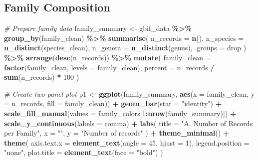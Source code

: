 \documentclass[
]{article}
\newenvironment{Shaded}{\begin{snugshade}}{\end{snugshade}}
\newcommand{\AttributeTok}[1]{\textcolor[rgb]{0.13,0.29,0.53}{#1}}
\newcommand{\CommentTok}[1]{\textcolor[rgb]{0.56,0.35,0.01}{\textit{#1}}}
\newcommand{\DecValTok}[1]{\textcolor[rgb]{0.00,0.00,0.81}{#1}}
\newcommand{\FunctionTok}[1]{\textcolor[rgb]{0.13,0.29,0.53}{\textbf{#1}}}
\newcommand{\NormalTok}[1]{#1}
\newcommand{\OtherTok}[1]{\textcolor[rgb]{0.56,0.35,0.01}{#1}}
\newcommand{\SpecialCharTok}[1]{\textcolor[rgb]{0.81,0.36,0.00}{\textbf{#1}}}
\newcommand{\StringTok}[1]{\textcolor[rgb]{0.31,0.60,0.02}{#1}}
\begin{document}
\subsection{Family Composition}\label{family-composition}

\begin{Shaded}
\begin{Highlighting}[]
\CommentTok{\# Prepare family data}
\NormalTok{family\_summary }\OtherTok{\textless{}{-}}\NormalTok{ gbif\_data }\SpecialCharTok{\%\textgreater{}\%}
  \FunctionTok{group\_by}\NormalTok{(family\_clean) }\SpecialCharTok{\%\textgreater{}\%}
  \FunctionTok{summarise}\NormalTok{(}
    \AttributeTok{n\_records =} \FunctionTok{n}\NormalTok{(),}
    \AttributeTok{n\_species =} \FunctionTok{n\_distinct}\NormalTok{(species\_clean),}
    \AttributeTok{n\_genera =} \FunctionTok{n\_distinct}\NormalTok{(genus),}
    \AttributeTok{.groups =} \StringTok{\textquotesingle{}drop\textquotesingle{}}
\NormalTok{  ) }\SpecialCharTok{\%\textgreater{}\%}
  \FunctionTok{arrange}\NormalTok{(}\FunctionTok{desc}\NormalTok{(n\_records)) }\SpecialCharTok{\%\textgreater{}\%}
  \FunctionTok{mutate}\NormalTok{(}
    \AttributeTok{family\_clean =} \FunctionTok{factor}\NormalTok{(family\_clean, }\AttributeTok{levels =}\NormalTok{ family\_clean),}
    \AttributeTok{percent =}\NormalTok{ n\_records }\SpecialCharTok{/} \FunctionTok{sum}\NormalTok{(n\_records) }\SpecialCharTok{*} \DecValTok{100}
\NormalTok{  )}

\CommentTok{\# Create two{-}panel plot}
\NormalTok{p1 }\OtherTok{\textless{}{-}} \FunctionTok{ggplot}\NormalTok{(family\_summary, }\FunctionTok{aes}\NormalTok{(}\AttributeTok{x =}\NormalTok{ family\_clean, }\AttributeTok{y =}\NormalTok{ n\_records, }\AttributeTok{fill =}\NormalTok{ family\_clean)) }\SpecialCharTok{+}
  \FunctionTok{geom\_bar}\NormalTok{(}\AttributeTok{stat =} \StringTok{"identity"}\NormalTok{) }\SpecialCharTok{+}
  \FunctionTok{scale\_fill\_manual}\NormalTok{(}\AttributeTok{values =}\NormalTok{ family\_colors[}\DecValTok{1}\SpecialCharTok{:}\FunctionTok{nrow}\NormalTok{(family\_summary)]) }\SpecialCharTok{+}
  \FunctionTok{scale\_y\_continuous}\NormalTok{(}\AttributeTok{labels =}\NormalTok{ comma) }\SpecialCharTok{+}
  \FunctionTok{labs}\NormalTok{(}
    \AttributeTok{title =} \StringTok{"A. Number of Records per Family"}\NormalTok{,}
    \AttributeTok{x =} \StringTok{""}\NormalTok{, }\AttributeTok{y =} \StringTok{"Number of records"}
\NormalTok{  ) }\SpecialCharTok{+}
  \FunctionTok{theme\_minimal}\NormalTok{() }\SpecialCharTok{+}
  \FunctionTok{theme}\NormalTok{(}
    \AttributeTok{axis.text.x =} \FunctionTok{element\_text}\NormalTok{(}\AttributeTok{angle =} \DecValTok{45}\NormalTok{, }\AttributeTok{hjust =} \DecValTok{1}\NormalTok{),}
    \AttributeTok{legend.position =} \StringTok{"none"}\NormalTok{,}
    \AttributeTok{plot.title =} \FunctionTok{element\_text}\NormalTok{(}\AttributeTok{face =} \StringTok{"bold"}\NormalTok{)}
\NormalTok{  )}


\end{Highlighting}
\end{Shaded}
\end{document}
